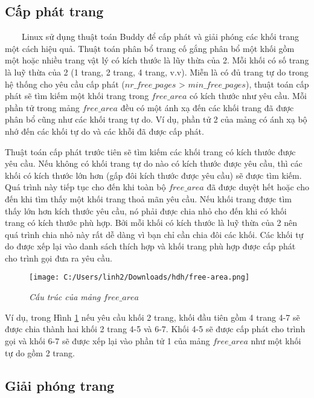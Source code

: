 \documentclass{article}
\begin{document}
\subsection{Cấp phát trang}

~~~~Linux sử dụng thuật toán Buddy để cấp phát và giải phóng các khối trang một cách hiệu quả. Thuật toán phân bổ trang cố gắng phân bổ một khối gồm một hoặc nhiều trang vật lý có kích thước là lũy thừa của 2. Mỗi khối có số trang là luỹ thừa của 2 (1 trang, 2 trang, 4 trang, v.v). Miễn là có đủ trang tự do trong hệ thống cho yêu cầu cấp phát ($nr\_free\_pages$ > $min\_free\_pages$), thuật toán cấp phát sẽ tìm kiếm  một khối trang trong $free\_area$ có kích thước như yêu cầu. Mỗi phần tử trong mảng $free\_area$ đều có một ánh xạ đến các khối trang đã được phân bổ cũng như các khối trang tự do. Ví dụ, phần tử 2 của mảng có ánh xạ bộ nhớ đến các khối tự do và các khỗi đã được cấp phát.\vspace{1em}

Thuật toán cấp phát trước tiên sẽ tìm kiếm các khối trang có kích thước được yêu cầu. Nếu không có khối trang tự do nào có kích thước được yêu cầu, thì các khối có kích thước lớn hơn (gấp đôi kích thước được yêu cầu) sẽ được tìm kiếm. Quá trình này tiếp tục cho đến khi toàn bộ $free\_area$ đã được duyệt hết hoặc cho đến khi tìm thấy một khối trang thoả mãn yêu cầu. Nếu khối trang được tìm thấy lớn hơn kích thước yêu cầu, nó phải được chia nhỏ cho đến khi có khối trang có kích thước phù hợp. Bởi mỗi khối có kích thước là luỹ thừa của 2 nên quá trình chia nhỏ này rất dễ dàng vì bạn chỉ cần chia đôi các khối. Các khối tự do được xếp lại vào danh sách thích hợp và khối trang phù hợp được cấp phát cho trình gọi đưa ra yêu cầu.

\begin{figure}[H]
  \centering
  \texttt{[image: C:/Users/linh2/Downloads/hdh/free-area.png]}
  \caption{\textit{Cấu trúc của mảng $free\_area$}}
  \label{fig:pageallocation}
\end{figure}

Ví dụ, trong Hình \ref{fig:pageallocation} nếu yêu cầu khối 2 trang, khối đầu tiên gồm 4 trang 4-7 sẽ được chia thành hai khối 2 trang 4-5 và 6-7. Khối 4-5 sẽ được cấp phát cho trình gọi và khối 6-7 sẽ được xếp lại vào phần tử 1 của mảng $free\_area$ như một khối tự do gồm 2 trang.

\subsection{Giải phóng trang}
\end{document}
